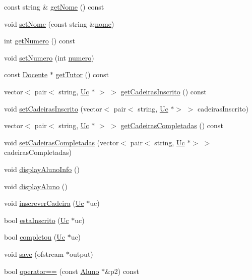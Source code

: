 \begin{DoxyCompactItemize}
const string \& \hyperlink{class_aluno_a3070c2f9d3933ce8fe336b1fa53ca7b7}{get\+Nome} () const
\item 
void \hyperlink{class_aluno_a67c455668824da3badaeb3a2eb2c8c4d}{set\+Nome} (const string \&\hyperlink{class_aluno_a22e26cb85066e4dfdc144c502819a7b4}{nome})
\item 
int \hyperlink{class_aluno_afcbe89f392d4c6332bcbd17184ad50bb}{get\+Numero} () const
\item 
void \hyperlink{class_aluno_a36ad83483a9e0c247d7092a95607758c}{set\+Numero} (int \hyperlink{class_aluno_a49ba5929b875d3f502c48245775b834c}{numero})
\item 
const \hyperlink{class_docente}{Docente} $\ast$ \hyperlink{class_aluno_a26e3da1324ccda24ba0f73bd39d2ea63}{get\+Tutor} () const
\item 
vector$<$ pair$<$ string, \hyperlink{class_uc}{Uc} $\ast$ $>$ $>$ \hyperlink{class_aluno_a9caa50647a1ebb3882e1e01a39e78aa4}{get\+Cadeiras\+Inscrito} () const
\item 
void \hyperlink{class_aluno_a998361a645330ab98133ebaeb2e62058}{set\+Cadeiras\+Inscrito} (vector$<$ pair$<$ string, \hyperlink{class_uc}{Uc} $\ast$$>$ $>$ cadeiras\+Inscrito)
\item 
vector$<$ pair$<$ string, \hyperlink{class_uc}{Uc} $\ast$ $>$ $>$ \hyperlink{class_aluno_a5c6936a1faa21d970aaaaf922d3f6203}{get\+Cadeiras\+Completadas} () const
\item 
void \hyperlink{class_aluno_aaeb693e1e8888a1034253cb2d4e3fe79}{set\+Cadeiras\+Completadas} (vector$<$ pair$<$ string, \hyperlink{class_uc}{Uc} $\ast$$>$ $>$ cadeiras\+Completadas)
\item 
void \hyperlink{class_aluno_a32eabc2f1bb3a3a7f03e048210bc47cd}{display\+Aluno\+Info} ()
\item 
void \hyperlink{class_aluno_aee32fb416fb5164c9b474a163b55977a}{display\+Aluno} ()
\item 
void \hyperlink{class_aluno_ac4010eebc776c72f5575b4ea8b230209}{inscrever\+Cadeira} (\hyperlink{class_uc}{Uc} $\ast$uc)
\item 
bool \hyperlink{class_aluno_ab1c56db2906bb038c877a1078358b1b8}{esta\+Inscrito} (\hyperlink{class_uc}{Uc} $\ast$uc)
\item 
bool \hyperlink{class_aluno_a632f91e407309ff24b5e1ee20c2d8daf}{completou} (\hyperlink{class_uc}{Uc} $\ast$uc)
\item 
void \hyperlink{class_aluno_add3489276cc0bccd4f2ac39e3a190979}{save} (ofstream $\ast$output)
\item 
bool \hyperlink{class_aluno_a9eeb557159beb7c7c833134ea27f4b56}{operator==} (const \hyperlink{class_aluno}{Aluno} $\ast$\&p2) const

\end{DoxyCompactItemize}
